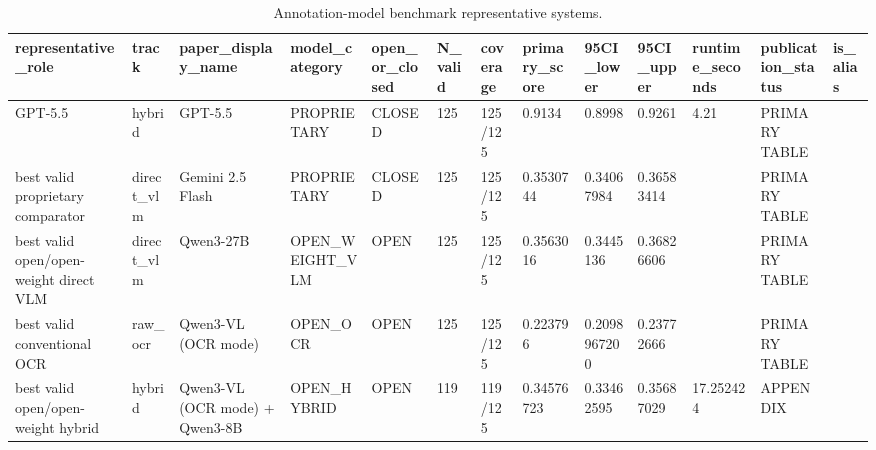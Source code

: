 \begin{table}
\caption{Annotation-model benchmark representative systems.}
\begin{tabular}{lllllllllllll}
\toprule
representative\_role & track & paper\_display\_name & model\_category & open\_or\_closed & N\_valid & coverage & primary\_score & 95CI\_lower & 95CI\_upper & runtime\_seconds & publication\_status & is\_alias \\
\midrule
GPT-5.5 & hybrid & GPT-5.5 & PROPRIETARY & CLOSED & 125 & 125/125 & 0.9134 & 0.8998 & 0.9261 & 4.21 & PRIMARY TABLE &  \\
best valid proprietary comparator & direct\_vlm & Gemini 2.5 Flash & PROPRIETARY & CLOSED & 125 & 125/125 & 0.3530744 & 0.34067984 & 0.36583414 &  & PRIMARY TABLE &  \\
best valid open/open-weight direct VLM & direct\_vlm & Qwen3-27B & OPEN\_WEIGHT\_VLM & OPEN & 125 & 125/125 & 0.3563016 & 0.3445136 & 0.36826606 &  & PRIMARY TABLE &  \\
best valid conventional OCR & raw\_ocr & Qwen3-VL (OCR mode) & OPEN\_OCR & OPEN & 125 & 125/125 & 0.223796 & 0.2098967200 & 0.23772666 &  & PRIMARY TABLE &  \\
best valid open/open-weight hybrid & hybrid & Qwen3-VL (OCR mode) + Qwen3-8B & OPEN\_HYBRID & OPEN & 119 & 119/125 & 0.34576723 & 0.33462595 & 0.35687029 & 17.252424 & APPENDIX &  \\
\bottomrule
\end{tabular}
\end{table}
